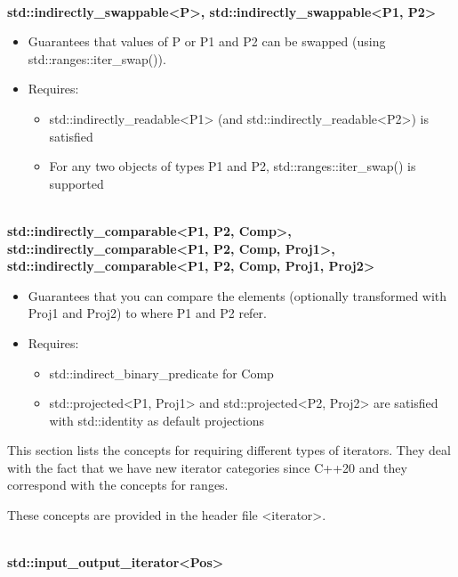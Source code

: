 \noindent
\hspace*{\fill} \\ %
\textbf{std::indirectly\_swappable<P>, std::indirectly\_swappable<P1, P2>}

\begin{itemize}
\item
Guarantees that values of P or P1 and P2 can be swapped (using std::ranges::iter\_swap()).

\item
Requires:
\begin{itemize}
\item
std::indirectly\_readable<P1> (and std::indirectly\_readable<P2>) is satisfied

\item
For any two objects of types P1 and P2, std::ranges::iter\_swap() is supported
\end{itemize}
\end{itemize}

\noindent
\hspace*{\fill} \\ %
\textbf{std::indirectly\_comparable<P1, P2, Comp>, std::indirectly\_comparable<P1, P2, Comp, Proj1>, std::indirectly\_comparable<P1, P2, Comp, Proj1, Proj2>}

\begin{itemize}
\item
Guarantees that you can compare the elements (optionally transformed with Proj1 and Proj2) to where P1 and P2 refer.

\item
Requires:
\begin{itemize}
\item
std::indirect\_binary\_predicate for Comp

\item
std::projected<P1, Proj1> and std::projected<P2, Proj2> are satisfied with std::identity as default projections
\end{itemize}
\end{itemize}


This section lists the concepts for requiring different types of iterators. They deal with the fact that we have new iterator categories since C++20 and they correspond with the concepts for ranges.

These concepts are provided in the header file <iterator>.

\noindent
\hspace*{\fill} \\ %
\textbf{std::input\_output\_iterator<Pos>}

